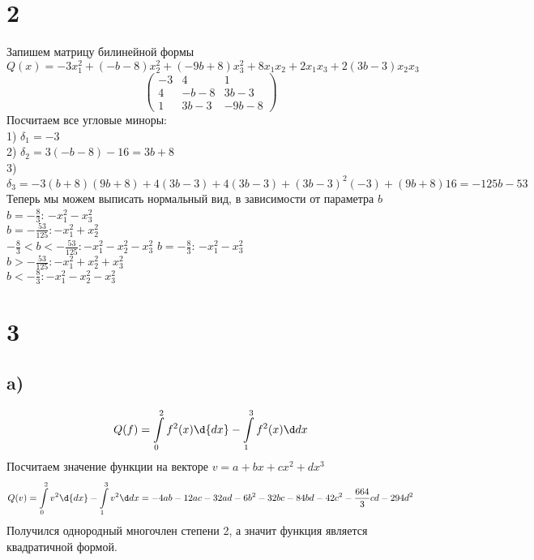 	\section*{2}
	Запишем матрицу билинейной формы\\ $$Q(x) = -3x_1^2+(-b-8)x^2_2+(-9b+8)x^2_3+ 8x_1x_2 + 2x_1x_3 + 2(3b-3)x_2x_3$$
	$$\begin{pmatrix}
		-3 & 4 & 1 \\
		4 & -b-8 & 3b-3 \\
		1 & 3b-3 & -9b-8
	\end{pmatrix}$$
	 Посчитаем все угловые миноры: \\
	 1) $\delta_1 = -3$\\
	 2)  $\delta_2 = 3(-b-8)-16 = 3b+8$\\
	 3)  $\delta_3 = -3(b+8)(9b+8) + 4(3b-3) + 4(3b-3) + (3b-3)^2(-3) + (9b+8)16 = -125b-53$
	 Теперь мы можем выписать нормальный вид, в зависимости от параметра $b$ \\
	 $b = -\frac83$: $-x^2_1-x_3^2$\\
	 $b = -\frac{53}{125} : -x^2_1+x_2^2$ \\
$-\frac83 < b< -\frac{53}{125}: -x^2_1-x_2^2-x^2_3$  
	 $b = -\frac83$: $-x^2_1-x_3^2$\\
$b >-\frac{53}{125}: -x^2_1+x_2^2+x^2_3$ \\
$b <-\frac{8}{3}: -x^2_1-x_2^2-x^2_3$ 
\section*{3}
\subsection*{a)}
$$Q(f) = \int\limits_0^2f^2(x)\d{dx} - \int\limits_{1}^{3}f^2(x)\dx$$
Посчитаем значение функции на векторе $v = a+bx+cx^2+dx^3$
$$Q(v) = \int\limits_0^2v^2\d{dx} - \int\limits_{1}^{3}v^2\dx = -4ab-12ac-32ad-6b^2-32bc-84bd-42c^2-\frac{664}{3}cd -294d^2$$
Получился однородный многочлен степени 2, а значит функция является квадратичной формой.
